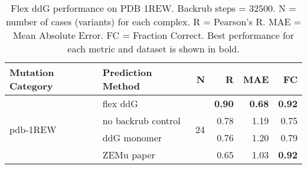 \begin{table}
  \begin{tabular}{llrrrr}
\toprule
Mutation Category &   Prediction Method &   N &    R &  MAE &   FC \\
\midrule
 \multirow{ 4}{*}{pdb-1REW} & flex ddG & \multirow{ 4}{*}{24} & \textbf{0.90} & \textbf{0.68} & \textbf{0.92}  \\
 & no backrub control & & 0.78 & 1.19 & 0.75  \\
 & ddG monomer & & 0.76 & 1.20 & 0.79  \\
 & ZEMu paper & & 0.65 & 1.03 & \textbf{0.92}  \\
\bottomrule
\end{tabular}
  \caption[Flex ddG performance on PDB 1REW]{
    Flex ddG performance on PDB 1REW. Backrub steps = 32500. N = number of cases (variants) for each complex. R = Pearson's R. MAE = Mean Absolute Error. FC = Fraction Correct. Best performance for each metric and dataset is shown in bold.
  } \label{tab:table-pdb-1REW}
\end{table}
